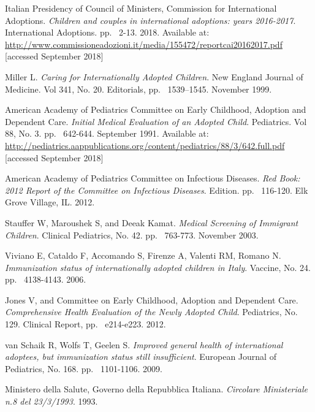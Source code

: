 \begin{thebibliography}{50}
  Italian Presidency of Council of Ministers, Commission for International Adoptions.
  \textit{Children and couples in international adoptions: years 2016-2017}.
  International Adoptions.
  pp. ~2-13.
  2018.
  Available at: \url{http://www.commissioneadozioni.it/media/155472/reportcai20162017.pdf} [accessed September 2018]  
  
  Miller L.
  \textit{Caring for Internationally Adopted Children}.
  New England Journal of Medicine. Vol 341, No. 20.
  Editorials,
  pp. ~1539–1545.
  November 1999.
  
  American Academy of Pediatrics Committee on Early Childhood, Adoption and Dependent Care.
  \textit{Initial Medical Evaluation of an Adopted Child}.
  Pediatrics. Vol 88, No. 3.
  pp. ~642-644.
  September 1991.
  Available at: \url{http://pediatrics.aappublications.org/content/pediatrics/88/3/642.full.pdf} [accessed September 2018]
  
  American Academy of Pediatrics Committee on Infectious Diseases.
  \textit{Red Book: 2012 Report of the Committee on Infectious Diseases}.
   Edition.
  pp. ~116-120.
  Elk Grove Village, IL.
  2012.

  Stauffer W, Maroushek S, and Deeak Kamat.
  \textit{Medical Screening of Immigrant Children}.
  Clinical Pediatrics, No. 42.
  pp. ~763-773.
  November 2003.
  
  Viviano E, Cataldo F, Accomando S, Firenze A, Valenti RM, Romano N.
  \textit{Immunization status of internationally adopted children in Italy}.
  Vaccine, No. 24.
  pp. ~4138-4143.
  2006.
  
  Jones V, and Committee on Early Childhood, Adoption and Dependent Care.
  \textit{Comprehensive Health Evaluation of the Newly Adopted Child}.
  Pediatrics, No. 129.
  Clinical Report,
  pp. ~e214-e223.
  2012.
  
  van Schaik R, Wolfs T, Geelen S.
  \textit{Improved general health of international adoptees, but immunization status still insufficient}.
  European Journal of Pediatrics, No. 168.
  pp. ~1101-1106.
  2009.
  
  Ministero della Salute, Governo della Repubblica Italiana.
  \textit{Circolare Ministeriale n.8 del 23/3/1993}.
  1993.


\end{thebibliography}

